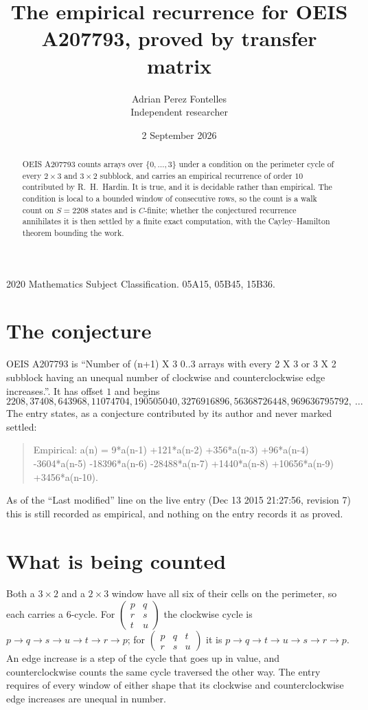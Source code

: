 \documentclass[11pt,a4paper]{article}
\title{The empirical recurrence for OEIS A207793, proved by transfer matrix}
\author{Adrian Perez Fontelles\\ \small Independent researcher}
\date{2 September 2026}
\theoremstyle{plain}
\theoremstyle{definition}
\begin{document}
\maketitle

\begin{abstract}
OEIS A207793 counts arrays over $\{0,\dots,3\}$ under a condition on the perimeter cycle of
every $2\times3$ and $3\times2$ subblock, and carries an empirical recurrence of order $10$ contributed by
R.~H.~Hardin. It is true, and it is decidable rather than empirical. The condition is local to
a bounded window of consecutive rows, so the count is a walk count on $S=2208$ states and is
$C$-finite; whether the conjectured recurrence annihilates it is then settled by a finite exact
computation, with the Cayley--Hamilton theorem bounding the work.
\end{abstract}

\noindent\small 2020 Mathematics Subject Classification. 05A15, 05B45, 15B36.\normalsize

\section{The conjecture}

OEIS A207793 is ``Number of (n+1) X 3 0..3 arrays with every 2 X 3 or 3 X 2 subblock having an unequal number of clockwise and counterclockwise edge increases.''. It has offset $1$ and begins
\[
2208, 37408, 643968, 11074704, 190505040, 3276916896, 56368726448, 969636795792,\ \dots
\]
The entry states, as a conjecture contributed by its author and never marked settled:
\begin{quote}
Empirical: a(n) = 9*a(n-1) +121*a(n-2) +356*a(n-3) +96*a(n-4) -3604*a(n-5) -18396*a(n-6) -28488*a(n-7) +1440*a(n-8) +10656*a(n-9) +3456*a(n-10).
\end{quote}
As of the ``Last modified'' line on the live entry (Dec 13 2015 21:27:56, revision 7) this is still
recorded as empirical, and nothing on the entry records it as proved.

\section{What is being counted}

Both a $3\times2$ and a $2\times3$ window have all six of their cells on the
perimeter, so each carries a $6$-cycle. For
$\begin{pmatrix}p&q\\r&s\\t&u\end{pmatrix}$ the clockwise cycle is
$p\to q\to s\to u\to t\to r\to p$; for
$\begin{pmatrix}p&q&t\\r&s&u\end{pmatrix}$ it is
$p\to q\to t\to u\to s\to r\to p$. An edge increase is a step of the cycle that goes up in
value, and counterclockwise counts the same cycle traversed the other way. The entry requires
of every window of either shape that its clockwise and counterclockwise edge increases are unequal in number.
\end{document}
